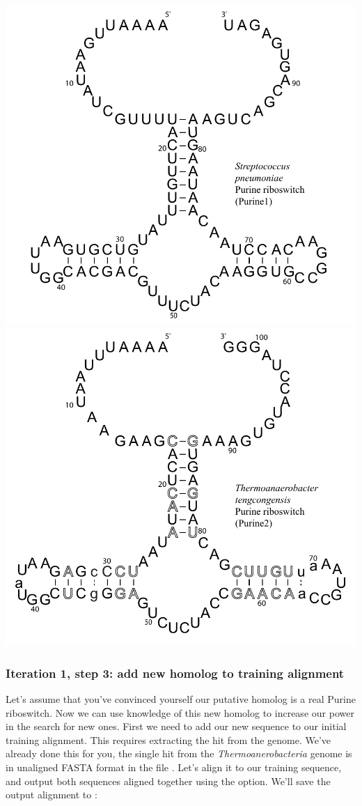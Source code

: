 \begin{center}
\includegraphics[scale=0.5]{Figures/purine1_full}
\includegraphics[scale=0.5]{Figures/purine2_full}
\end{center}

\subsubsection{Iteration 1, step 3: add new homolog to training alignment}
Let's assume that you've convinced yourself our putative homolog is a real Purine
riboswitch. Now we can use knowledge of this new homolog to increase
our power in the search for new ones. First we need to add our new
sequence to our initial training alignment. This requires extracting
the hit from the genome. We've already done this for you, the single
hit from the \emph{Thermoanerobacteria} genome is in unaligned FASTA format
in the file . Let's align it to our training
sequence, and output both sequences aligned together using the
 option. We'll save the output alignment to
:


